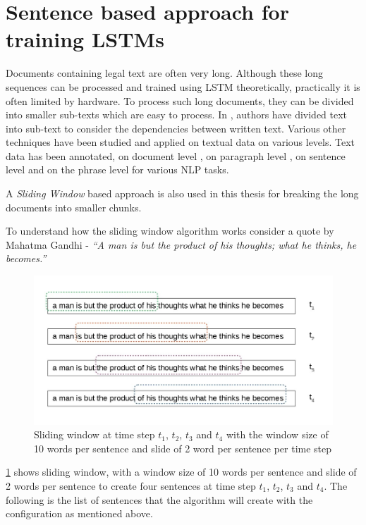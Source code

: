 \section{Sentence based approach for training LSTMs} \label{backgroundSlidingWindow}

Documents containing legal text are often very long. Although these long sequences can be processed and trained using \gls{LSTM} \cite{hochreiter1997long} theoretically,  practically it is often limited by hardware. To process such long documents, they can be divided into smaller sub-texts which are easy to process. In \cite{volkovich2016text}, authors have divided text into sub-text to consider the dependencies between written text. Various other techniques have been studied and applied on textual data on various levels. Text data has been annotated, on document level \cite{macdonald2006trec}, on paragraph level \cite{ferguson2009exploring}, on sentence level \cite{santos2009integrating, seki2008overview} and on the phrase level \cite{wilson2005recognizing} for various \gls{NLP} tasks. 

A \textit{Sliding Window} based approach is also used in this thesis for breaking the long documents into smaller chunks.

To understand how the sliding window algorithm works consider a quote by Mahatma Gandhi - \textit{``A man is but the product of his thoughts; what he thinks, he becomes.''}

\begin{figure}[!ht]
    \centering
    \includegraphics[width=12cm]{pics/SlidingWindow.jpg}
    \captionsetup{justification=centering,margin=2cm}
    \caption{Sliding window at time step $t_{1}$, $t_{2}$, $t_{3}$ and $t_{4}$ with the window size of 10 words per sentence and slide of 2 word per sentence per time step}
    \label{fig:sldingwindow}
\end{figure}

\ref{fig:sldingwindow} shows sliding window, with a window size of 10 words per sentence and slide of 2 words per sentence to create four sentences at time step $t_{1}$, $t_{2}$, $t_{3}$ and $t_{4}$. The following is the list of sentences that the algorithm will create with the configuration as mentioned above.

